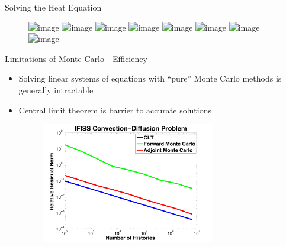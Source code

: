 \documentclass{beamer}
\begin{document}
\begin{frame}{Solving the Heat Equation}

  \begin{figure}[h!]
    \begin{center}
      \includegraphics<1>[width=4in]{../NCState_seminar_2014/adjoint_1}
      \includegraphics<2>[width=4in]{../NCState_seminar_2014/adjoint_10}
      \includegraphics<3>[width=4in]{../NCState_seminar_2014/adjoint_100}
      \includegraphics<4>[width=4in]{../NCState_seminar_2014/adjoint_1000}
      \includegraphics<5>[width=4in]{../NCState_seminar_2014/adjoint_10000}
      \includegraphics<6>[width=4in]{../NCState_seminar_2014/adjoint_100000}
      \includegraphics<7>[width=4in]{../NCState_seminar_2014/adjoint_1000000}
      \includegraphics<8>[width=4in]{../NCState_seminar_2014/adjoint_10000000}
    \end{center}
    \caption{
    }
  \end{figure}
\end{frame}


\begin{frame}{Limitations of Monte Carlo---Efficiency}
  \begin{itemize}
  \item Solving linear systems of equations with ``pure'' Monte Carlo methods
    is generally intractable
  \item Central limit theorem is barrier to accurate solutions
    \begin{figure}
      \centering
      \includegraphics[width=3in]{../NCState_seminar_2014/Ifiss_ConvDiff}
    \end{figure}
  \end{itemize}
\end{frame}
\end{document}
